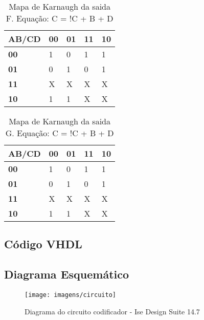 \documentclass[12pts]{article}
\begin{document}
\begin{table}[h]
\begin{center}
	\begin{tabular}{|l|l|l|l|l|}
		\hline
		\textbf{AB/CD} & \textbf{00} & \textbf{01} & \textbf{11} & \textbf{10}\\
		\hline
		\textbf{00} & 1 & 0 & 1 & 1\\
		\hline
		\textbf{01} & 0 & 1 & 0 & 1\\
		\hline
		\textbf{11} & X & X & X & X\\
		\hline
		\textbf{10} & 1 & 1 & X & X\\
		\hline
	\end{tabular}
\end{center}
	\caption{Mapa de Karnaugh da saida F. Equação: C = !C + B + D }
	\end{table}
	\singlespacing
	
\begin{table}[h]
\begin{center}
	\begin{tabular}{|l|l|l|l|l|}
		\hline
		\textbf{AB/CD} & \textbf{00} & \textbf{01} & \textbf{11} & \textbf{10}\\
		\hline
		\textbf{00} & 1 & 0 & 1 & 1\\
		\hline
		\textbf{01} & 0 & 1 & 0 & 1\\
		\hline
		\textbf{11} & X & X & X & X\\
		\hline
		\textbf{10} & 1 & 1 & X & X\\
		\hline
	\end{tabular}
\end{center}
	\caption{Mapa de Karnaugh da saida G. Equação: C = !C + B + D }
	\end{table}
	\singlespacing

\clearpage
\subsection{Código VHDL}


\clearpage
\subsection{Diagrama Esquemático}
\begin{figure}[!htb]
  \centering
  \texttt{[image: imagens/circuito]}
  \caption{Diagrama do circuito codificador - Ise Design Suite 14.7}	
  \label{figRotulo}
\end{figure}
\end{document}
